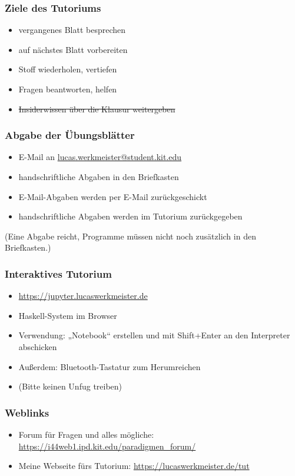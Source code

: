\documentclass{beamer}
\date{2016-10-24/25}
\begin{document}
\normalsize
\normalem

\begin{frame}[plain]
  \titlepage
\end{frame}

\begin{frame}
  \frametitle{Ziele des Tutoriums}
  \pause
  \begin{itemize}
  \item vergangenes Blatt besprechen
  \item auf nächstes Blatt vorbereiten
  \item Stoff wiederholen, vertiefen
  \item Fragen beantworten, helfen
  \item \sout{Insiderwissen über die Klausur weitergeben}
  \end{itemize}
\end{frame}

\begin{frame}
  \frametitle{Abgabe der Übungsblätter}
  \begin{itemize}
  \item E-Mail an \href{mailto:lucas.werkmeister@student.kit.edu?subject=[PP2016] Blatt X, MN 1234567}{lucas.werkmeister@student.kit.edu}
  \item handschriftliche Abgaben in den Briefkasten
  \item E-Mail-Abgaben werden per E-Mail zurückgeschickt
  \item handschriftliche Abgaben werden im Tutorium zurückgegeben
  \end{itemize}
  (Eine Abgabe reicht, Programme müssen nicht noch zusätzlich in den Briefkasten.)
\end{frame}

\begin{frame}
  \frametitle{Interaktives Tutorium}
  \begin{itemize}
  \item \url{https://jupyter.lucaswerkmeister.de}
  \item Haskell-System im Browser
  \item Verwendung: „Notebook“ erstellen und mit Shift+Enter an den Interpreter abschicken
  \item Außerdem: Bluetooth-Tastatur zum Herumreichen
  \item (Bitte keinen Unfug treiben)
  \end{itemize}
\end{frame}

\begin{frame}
  \frametitle{Weblinks}
  \begin{itemize}
  \item Forum für Fragen und alles mögliche: \url{https://i44web1.ipd.kit.edu/paradigmen_forum/}
  \item Meine Webseite fürs Tutorium: \url{https://lucaswerkmeister.de/tut}
  \end{itemize}
\end{frame}
\end{document}
